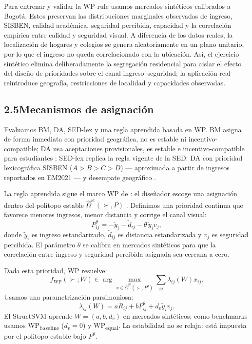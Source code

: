 \documentclass[12pt,a4paper]{article}
\begin{document}
Para entrenar y validar la WP-rule usamos mercados sintéticos calibrados a
Bogotá. Estos preservan las distribuciones marginales observadas de ingreso,
SISBEN, calidad académica, seguridad percibida, capacidad y la correlación
empírica entre calidad y seguridad visual. A diferencia de los datos reales, la
localización de hogares y colegios se genera aleatoriamente en un plano unitario,
por lo que el ingreso no queda correlacionado con la ubicación. Así, el ejercicio
sintético elimina deliberadamente la segregación residencial para aislar el efecto
del diseño de prioridades sobre el canal ingreso--seguridad; la aplicación real
reintroduce geografía, restricciones de localidad y capacidades observadas.

\subsection*{2.5\quad Mecanismos de asignación}

Evaluamos BM, DA, SED-lex y una regla aprendida basada en WP. BM asigna de forma
inmediata con prioridad geográfica, no es estable ni incentivo-compatible; DA usa
aceptaciones provisionales, es estable e incentivo-compatible para estudiantes
\citep{AbdulSonmez2003}; SED-lex replica la regla vigente de la SED: DA con
prioridad lexicográfica SISBEN ($A>B>C>D$) --- aproximada a partir de ingresos
reportados en EM2021 --- y desempate geográfico \citep{Resolucion1587}.

La regla aprendida sigue el marco WP de \citet{NarasimhanAgarwalParkes2016}: el
diseñador escoge una asignación dentro del politopo estable
$\widehat{\Omega}^{\mathrm{st}}(\succ,P)$ \citep{VandeVate1989}. Definimos una
prioridad continua que favorece menores ingresos, menor distancia y corrige el
canal visual:
\begin{equation}
P^\theta_{ij}
=
-\tilde y_i
- \widetilde d_{ij}
- \theta\,\tilde y_i v_j ,
\label{eq:priority_id}
\end{equation}
donde $\tilde y_i$ es ingreso estandarizado, $\widetilde d_{ij}$ es distancia
estandarizada y $v_j$ es seguridad percibida. El parámetro $\theta$ se calibra en
mercados sintéticos para que la correlación entre ingreso y seguridad percibida
asignada sea cercana a cero.

Dada esta prioridad, WP resuelve:
\begin{equation}
f_{\mathrm{WP}}(\succ;W)
\in
\arg\max_{x \in \widehat{\Omega}^{\mathrm{st}}(\succ,P^\theta)}
\sum_{ij} \lambda_{ij}(W)x_{ij}.
\label{eq:wp_rule}
\end{equation}
Usamos una parametrización parsimoniosa:
\begin{equation}
\lambda_{ij}(W)=aR_{ij}+bP^\theta_{ij}+d_v\tilde y_i v_j .
\label{eq:wp}
\end{equation}
El StructSVM aprende $W=(a,b,d_v)$ en mercados sintéticos; como benchmarks usamos
WP\textsubscript{baseline} ($d_v=0$) y WP\textsubscript{equal}. La estabilidad no
se relaja: está impuesta por el politopo estable bajo $P^\theta$.
\end{document}
